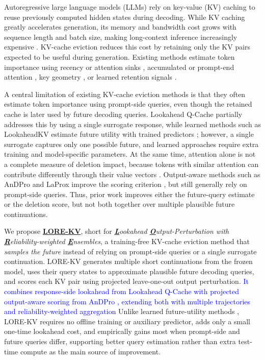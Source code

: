 \documentclass{article} %
\begin{document}
Autoregressive large language models (LLMs) rely on key-value (KV) caching to reuse previously computed hidden states during decoding. While KV caching greatly accelerates generation, its memory and bandwidth cost grows with sequence length and batch size, making long-context inference increasingly expensive \citep{behnam2025rocketkv,li2025kvtuner,lancucki2025hyperscaling}. KV-cache eviction reduces this cost by retaining only the KV pairs expected to be useful during generation. Existing methods estimate token importance using recency or attention sinks \citep{xiao2023streamingllm}, accumulated or prompt-end attention \citep{zhang2023h2o,liu2023scissorhands,li2024snapkv}, key geometry \citep{devoto2024simple,park2026keydiff}, or learned retention signals \citep{moschella2026learning,bui2026make}.

A central limitation of existing KV-cache eviction methods is that they often estimate token importance using prompt-side queries, even though the retained cache is later used by future decoding queries. Lookahead Q-Cache \citep{wang2025lookahead} partially addresses this by using a single surrogate response, while learned methods such as LookaheadKV estimate future utility with trained predictors \citep{ahn2026lookaheadkv,moschella2026learning,bui2026make}; however, a single surrogate captures only one possible future, and learned approaches require extra training and model-specific parameters. At the same time, attention alone is not a complete measure of deletion impact, because tokens with similar attention can contribute differently through their value vectors \citep{guo2024criticalkv}. Output-aware methods such as AnDPro and LaProx improve the scoring criterion \citep{geng2026accurate,mai2026laprox}, but still generally rely on prompt-side queries. Thus, prior work improves either the future-query estimate or the deletion score, but not both together over multiple plausible future continuations.

We propose \textbf{\underline{LORE-KV}}, short for \emph{\textbf{\underline{L}}ookahead \textbf{\underline{O}}utput-Perturbation with \textbf{\underline{R}}eliability-weighted \textbf{\underline{E}}nsembles}, a training-free KV-cache eviction method that \emph{samples the future} instead of relying on prompt-side queries or a single surrogate continuation. LORE-KV generates multiple short continuations from the frozen model, uses their query states to approximate plausible future decoding queries, and scores each KV pair using projected leave-one-out output perturbation. \textcolor{blue}{It combines response-side lookahead from Lookahead Q-Cache \citep{wang2025lookahead} with projected output-aware scoring from AnDPro \citep{geng2026accurate}, extending both with multiple trajectories and reliability-weighted aggregation} Unlike learned future-utility methods \citep{ahn2026lookaheadkv,moschella2026learning,bui2026make,yang2026indexmem}, LORE-KV requires no offline training or auxiliary predictor, adds only a small one-time lookahead cost, and empirically gains most when prompt-side and future queries differ, supporting better query estimation rather than extra test-time compute as the main source of improvement.
\end{document}
